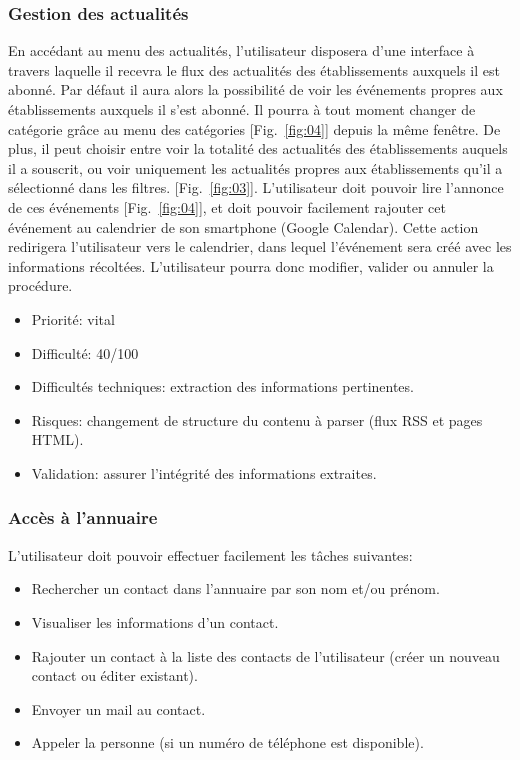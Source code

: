 \documentclass [pdftex,12pt] {report}
\begin{document}
\subsubsection{Gestion des actualités}
En accédant au menu des actualités, l'utilisateur disposera d'une interface à travers laquelle il recevra le flux des actualités des établissements auxquels il est abonné. Par défaut il aura alors la possibilité de voir les événements propres aux établissements auxquels il s'est abonné. Il pourra à tout moment changer de catégorie grâce au menu des catégories [Fig.~\ref{fig:04}] depuis la même fenêtre. De plus, il peut choisir entre voir la totalité des actualités des établissements auquels il a souscrit, ou voir uniquement les actualités propres aux établissements qu'il a sélectionné dans les filtres.  [Fig.~\ref{fig:03}]. L'utilisateur doit pouvoir lire l'annonce de ces événements [Fig.~\ref{fig:04}], et doit pouvoir facilement rajouter cet événement au calendrier de son smartphone (Google Calendar). Cette action redirigera l'utilisateur vers le calendrier, dans lequel l'événement sera créé avec les informations récoltées. L'utilisateur pourra donc modifier, valider ou annuler la procédure. \\

\begin{itemize}
\renewcommand{\labelitemi}{$\bullet$}
\item Priorité: vital
\item Difficulté: 40/100
\item Difficultés techniques: extraction des informations pertinentes.
\item Risques: changement de structure du contenu à parser (flux RSS et pages HTML).
\item Validation: assurer l'intégrité des informations extraites.
\end{itemize}

\subsubsection{Accès à l'annuaire}
L'utilisateur doit pouvoir effectuer facilement les tâches suivantes:\\
\begin{itemize}
\renewcommand{\labelitemi}{$\bullet$}
\item Rechercher un contact dans l'annuaire par son nom et/ou prénom.
\item Visualiser les informations d'un contact.
\item Rajouter un contact à la liste des contacts de l'utilisateur (créer un nouveau contact ou éditer existant).
\item Envoyer un mail au contact.
\item Appeler la personne (si un numéro de téléphone est disponible).
\end{itemize}
\end{document}
